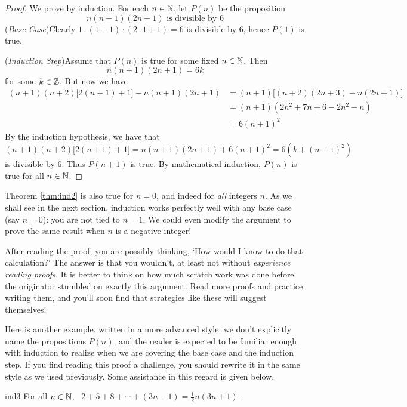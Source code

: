 \begin{proof}
	We prove by induction. For each $n\in\mathbb{N}$, let $P(n)$ be the proposition
	\[
		\text{$n(n+1)(2n+1)$ is divisible by 6}
	\]
	(\emph{Base Case})\quad Clearly $1\cdot (1+1)\cdot (2\cdot 1+1)=6$ is divisible by 6, hence $P(1)$ is true.\par
	(\emph{Induction Step})\quad Assume that $P(n)$ is true for some fixed $n\in\mathbb{N}$. Then
	\[
		n(n+1)(2n+1)=6k
	\]
	for some $k\in\mathbb{Z}$. But now we have
	\begin{align*}
		(n+1)(n+2)\bigl[2(n+1)+1\bigr]-n(n+1)(2n+1)&=(n+1)\bigl[(n+2)(2n+3)-n(2n+1)\bigr]\\
		&=(n+1)(2n^2+7n+6-2n^2-n)\\
		&=6(n+1)^2
	\end{align*}
	By the induction hypothesis, we have that
	\[
		(n+1)(n+2)\bigl[2(n+1)+1\bigr]=n(n+1)(2n+1)+6(n+1)^2=6(k+(n+1)^2)
	\]
	is divisible by 6. Thus $P(n+1)$ is true. By mathematical induction, $P(n)$ is true for all $n\in\mathbb{N}$.
\end{proof}

Theorem \ref{thm:ind2} is also true for $n=0$, and indeed for \emph{all} integers $n$. As we shall see in the next section, induction works perfectly well with any base case (say $n=0$): you are not tied to $n=1$. We could even modify the argument to prove the same result when $n$ is a negative integer!\par

After reading the proof, you are possibly thinking, `How would I know to do that calculation?' The answer is that you wouldn't, at least not without \emph{experience reading proofs.} It is better to think on how much scratch work was done before the originator stumbled on exactly this argument. Read more proofs and practice writing them, and you'll soon find that strategies like these will suggest themselves!\par

Here is another example, written in a more advanced style: we don't explicitly name the propositions $P(n)$, and the reader is expected to be familiar enough with induction to realize when we are covering the base case and the induction step. If you find reading this proof a challenge, you should rewrite it in the same style as we used previously. Some assistance in this regard is given below.

\begin{thm}{}{ind3}
	For all $n\in\mathbb{N}$, \ $2+5+8+\cdots+(3n-1)=\frac 12n(3n+1)$.
\end{thm}


